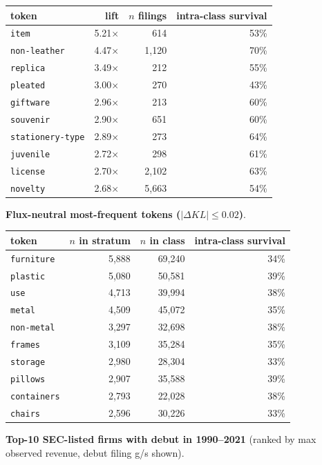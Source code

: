 \begin{tabular}{lrrr}
\toprule
token & lift & $n$ filings & intra-class survival \\
\midrule
\texttt{item} & 5.21$\times$ & 614 & 53\% \\
\texttt{non-leather} & 4.47$\times$ & 1,120 & 70\% \\
\texttt{replica} & 3.49$\times$ & 212 & 55\% \\
\texttt{pleated} & 3.00$\times$ & 270 & 43\% \\
\texttt{giftware} & 2.96$\times$ & 213 & 60\% \\
\texttt{souvenir} & 2.90$\times$ & 651 & 60\% \\
\texttt{stationery-type} & 2.89$\times$ & 273 & 64\% \\
\texttt{juvenile} & 2.72$\times$ & 298 & 61\% \\
\texttt{license} & 2.70$\times$ & 2,102 & 63\% \\
\texttt{novelty} & 2.68$\times$ & 5,663 & 54\% \\
\bottomrule
\end{tabular}

\textbf{Flux-neutral most-frequent tokens ($|\Delta KL|\leq 0.02$)}.

\begin{tabular}{lrrr}
\toprule
token & $n$ in stratum & $n$ in class & intra-class survival \\
\midrule
\texttt{furniture} & 5,888 & 69,240 & 34\% \\
\texttt{plastic} & 5,080 & 50,581 & 39\% \\
\texttt{use} & 4,713 & 39,994 & 38\% \\
\texttt{metal} & 4,509 & 45,072 & 35\% \\
\texttt{non-metal} & 3,297 & 32,698 & 38\% \\
\texttt{frames} & 3,109 & 35,284 & 35\% \\
\texttt{storage} & 2,980 & 28,304 & 33\% \\
\texttt{pillows} & 2,907 & 35,588 & 39\% \\
\texttt{containers} & 2,793 & 22,028 & 38\% \\
\texttt{chairs} & 2,596 & 30,226 & 33\% \\
\bottomrule
\end{tabular}

\textbf{Top-10 SEC-listed firms with debut in 1990--2021} (ranked by max observed revenue, debut filing g/s shown).

